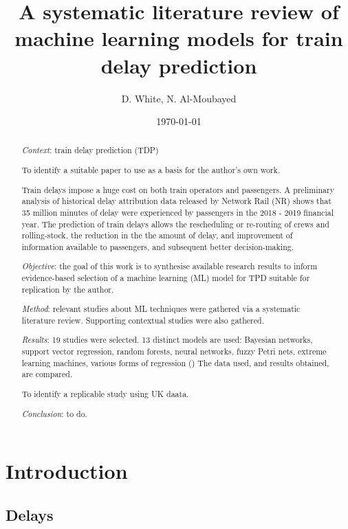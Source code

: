 \documentclass{article}
\title{A systematic literature review of machine learning models for train delay prediction}
\author{D. White, N. Al-Moubayed}
\date{\today}
\begin{document}
\begin{titlingpage}

\maketitle
\begin{abstract}

\textit{Context}: train delay prediction (TDP) 

To identify a suitable paper to use as a basis for the author's own work.

Train delays impose a huge cost on both train operators and passengers. A preliminary analysis of historical delay attribution data released by Network Rail (NR) shows that
35 million minutes of delay were experienced by passengers in the 2018 - 2019 financial year. The prediction of train delays allows the rescheduling or re-routing of crews and rolling-stock,
the reduction in the the amount of delay, and improvement of information available to passengers, and subsequent better decision-making. 

\textit{Objective}: the goal of this work is to synthesise available research results to inform evidence-based selection of a machine learning (ML) model for TPD suitable for replication by the author.

\textit{Method}: relevant studies about ML techniques were gathered via a systematic literature review. Supporting contextual studies were also gathered.

\textit{Results}: 19 studies were selected. 13 distinct models are used: Bayesian networks, support vector regression, random forests, neural networks, fuzzy Petri nets, extreme learning machines, various forms of regression () 
The data used, and results obtained, are compared. 

To identify a replicable study using UK daata.

\textit{Conclusion}: to do.

\end{abstract}
\end{titlingpage}

\tableofcontents
\clearpage

\section{Introduction}

\subsection{Delays}
\end{document}
